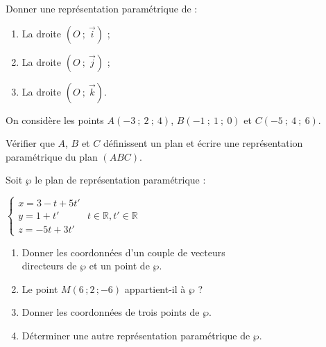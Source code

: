 \begin{colonne*exercice}
\begin{exercice}
  Donner une représentation paramétrique de :
  \begin{enumerate}
  \item La droite $(O\ ;\ \overrightarrow{i})$ ;
  \item La droite $(O\ ;\ \overrightarrow{j})$ ;
  \item La droite $(O\ ;\ \overrightarrow{k})$.
  \end{enumerate}
\end{exercice}

\begin{exercice}
  On considère les points $A(-3\ ;\ 2\ ;\ 4)$, $B(-1\ ;\ 1\ ;\ 0)$ et
  $C(-5\ ;\ 4\ ;\ 6)$.

  Vérifier que $A$, $B$ et $C$ définissent un plan et écrire une
  représentation paramétrique du plan $(ABC)$.
\end{exercice}



\begin{exercice}\label{ex54G2}
  Soit $\wp$ le plan de représentation paramétrique :

  \begin{center}
    $\begin{cases}x=3-t+5t' \\y=1+t' \\z=-5t+3t' \end{cases}$
    $t\in\mathbb{R}, t'\in\mathbb{R}$
  \end{center}

  \begin{enumerate}
  \item Donner les coordonnées d'un couple de vecteurs\\ directeurs de
    $\wp$ et un point de $\wp$.
  \item Le point $M(6\,;2\,;-6)$ appartient-il à $\wp$ ?
  \item Donner les coordonnées de trois points de $\wp$.
  \item Déterminer une autre représentation paramétrique de $\wp$.
  \end{enumerate}
\end{exercice}


\end{colonne*exercice}
